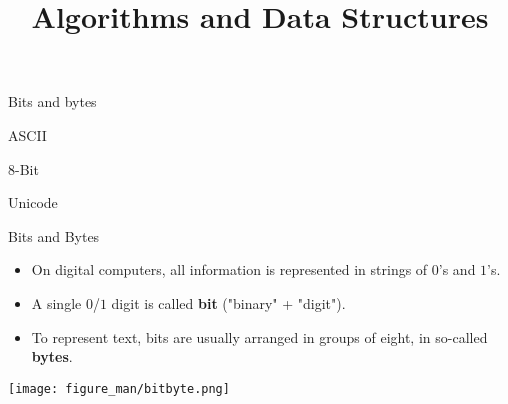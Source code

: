 \documentclass[11pt,compress,t,notes=noshow, xcolor=table]{beamer}
\title{Algorithms and Data Structures}
\begin{document}
{
  \item Bits and bytes
  \item ASCII
  \item 8-Bit
  \item Unicode
}









\begin{vbframe}{Bits and Bytes}
\begin{itemize}
\item On digital computers, all information is represented in strings of $0$'s and $1$'s.
\item A single $0$/$1$ digit is called \textbf{bit} ("binary" + "digit").
\item To represent text, bits are usually arranged in groups of eight, in so-called \textbf{bytes}.
\end{itemize}

\begin{center}
\texttt{[image: figure\_man/bitbyte.png]}
\end{center}


\end{vbframe}
\end{document}
